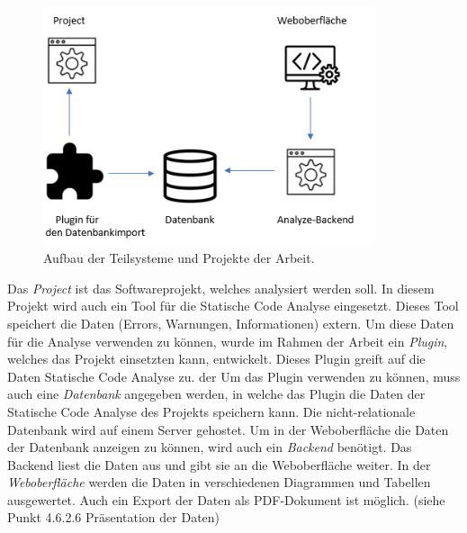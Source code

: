 \begin{figure}[tp]
  \centering
  \includegraphics[height=7cm]{images/infrastruktur.PNG}
 \caption[Aufbau der Teilsysteme und Projekte der Arbeit]{Aufbau der Teilsysteme und Projekte der Arbeit.}
  \label{fig:engine}
\end{figure}

Das \textit{Project} ist das Softwareprojekt, welches analysiert werden soll. In diesem Projekt wird auch ein Tool für die Statische Code Analyse eingesetzt. Dieses Tool speichert die Daten (Errors, Warnungen, Informationen) extern. Um diese Daten für die Analyse verwenden zu können, wurde im Rahmen der Arbeit ein \textit{Plugin}, welches das Projekt einsetzten kann, entwickelt. Dieses Plugin greift auf die Daten Statische Code Analyse zu. der Um das Plugin verwenden zu können, muss auch eine \textit{Datenbank} angegeben werden, in welche das Plugin die Daten der Statische Code Analyse des Projekts speichern kann. Die nicht-relationale Datenbank wird auf einem Server gehostet. Um in der Weboberfläche die Daten der Datenbank anzeigen zu können, wird auch ein \textit{Backend} benötigt. Das Backend liest die Daten aus und gibt sie an die Weboberfläche weiter. In der \textit{Weboberfläche} werden die Daten in verschiedenen Diagrammen und Tabellen ausgewertet. Auch ein Export der Daten als PDF-Dokument ist möglich. (siehe Punkt 4.6.2.6 Präsentation der Daten)



\chapterend